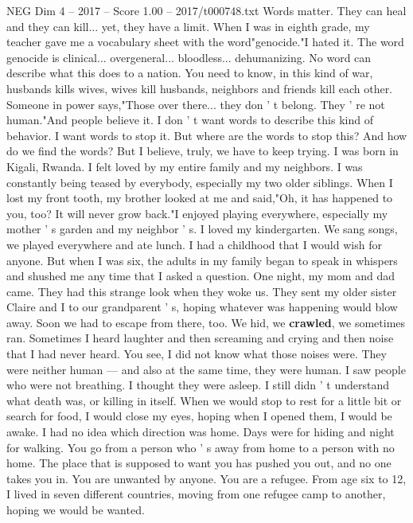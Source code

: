 \begin{textsample}{NEG Dim 4 – 2017 – Score 1.00 – 2017/t000748.txt}  \label{ex:f4_neg_040}
Words matter.
They can heal and they can kill... yet, they have a limit.
When I was in eighth grade, my teacher gave me a vocabulary sheet with the word"genocide."I hated it.
The word genocide is clinical... overgeneral... bloodless... dehumanizing.
No word can describe what this does to a nation.
You need to know, in this kind of war, husbands kills wives, wives kill husbands, neighbors and friends kill each other.
Someone in power says,"Those over there... they don ' t belong.
They ' re not human."And people believe it.
I don ' t want words to describe this kind of behavior.
I want words to stop it.
But where are the words to stop this?
And how do we find the words?
But I believe, truly, we have to keep trying.
I was born in Kigali, Rwanda.
I felt loved by my entire family and my neighbors.
I was constantly being teased by everybody, especially my two older siblings.
When I lost my front tooth, my brother looked at me and said,"Oh, it has happened to you, too?
It will never grow back."I enjoyed playing everywhere, especially my mother ' s garden and my neighbor ' s.
I loved my kindergarten.
We sang songs, we played everywhere and ate lunch.
I had a childhood that I would wish for anyone.
But when I was six, the adults in my family began to speak in whispers and shushed me any time that I asked a question.
One night, my mom and dad came.
They had this strange look when they woke us.
They sent my older sister Claire and I to our grandparent ' s, hoping whatever was happening would blow away.
Soon we had to escape from there, too.
We hid, we \textbf{crawled}, we sometimes ran.
Sometimes I heard laughter and then screaming and crying and then noise that I had never heard.
You see, I did not know what those noises were.
They were neither human — and also at the same time, they were human.
I saw people who were not breathing.
I thought they were asleep.
I still didn ' t understand what death was, or killing in itself.
When we would stop to rest for a little bit or search for food, I would close my eyes, hoping when I opened them, I would be awake.
I had no idea which direction was home.
Days were for hiding and night for walking.
You go from a person who ' s away from home to a person with no home.
The place that is supposed to want you has pushed you out, and no one takes you in.
You are unwanted by anyone.
You are a refugee.
From age six to 12, I lived in seven different countries, moving from one refugee camp to another, hoping we would be wanted.

\end{textsample}
